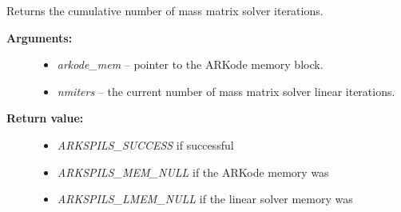 \documentclass[letterpaper,10pt,english]{sphinxmanual}
\begin{document}
\begin{fulllineitems}
\label{c_interface/User_callable:ARKSpilsGetNumMassIters}
Returns the cumulative number of mass matrix solver iterations.
\begin{description}
\item[{\textbf{Arguments:}}] \leavevmode\begin{itemize}
\item {} 
\emph{arkode\_mem} -- pointer to the ARKode memory block.

\item {} 
\emph{nmiters} -- the current number of mass matrix solver linear iterations.

\end{itemize}

\item[{\textbf{Return value:}}] \leavevmode\begin{itemize}
\item {} 
\emph{ARKSPILS\_SUCCESS} if successful

\item {} 
\emph{ARKSPILS\_MEM\_NULL} if the ARKode memory was 

\item {} 
\emph{ARKSPILS\_LMEM\_NULL} if the linear solver memory was 

\end{itemize}

\end{description}

\end{fulllineitems}

\end{document}

